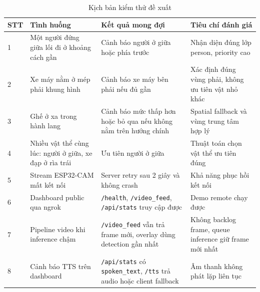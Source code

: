 \documentclass[oneside,final]{hcmut-report}
\begin{document}
\begin{table}[H]
  \centering
  \caption{Kịch bản kiểm thử đề xuất}
  \label{tab:test-scenarios}
  \small
  \begin{tabularx}{\textwidth}{L{1.0cm}Y Y Y}
    \toprule
    \textbf{STT} & \textbf{Tình huống} & \textbf{Kết quả mong đợi} & \textbf{Tiêu chí đánh giá} \\
     & Một người đứng giữa lối đi ở khoảng cách gần & Cảnh báo người ở giữa hoặc phía trước & Nhận diện đúng lớp person, priority cao \\
    2 & Xe máy nằm ở mép phải khung hình & Cảnh báo xe máy bên phải nếu đủ gần & Xác định đúng vùng phải, không ưu tiên vật nhỏ khác \\
    3 & Ghế ở xa trong hành lang & Cảnh báo mức thấp hơn hoặc bỏ qua nếu không nằm trên hướng chính & Spatial fallback và vùng trung tâm hợp lý \\
    4 & Nhiều vật thể cùng lúc: người ở giữa, xe đạp ở rìa trái & Ưu tiên người ở giữa & Thuật toán chọn vật thể ưu tiên đúng \\
    5 & Stream ESP32-CAM mất kết nối & Server retry sau 2 giây và không crash & Khả năng phục hồi kết nối \\
    6 & Dashboard public qua ngrok & \texttt{/health}, \texttt{/video\_feed}, \texttt{/api/stats} truy cập được & Demo remote chạy được \\
    7 & Pipeline video khi inference chậm & \texttt{/video\_feed} vẫn trả frame mới, overlay dùng detection gần nhất & Không backlog frame, queue inference giữ frame mới nhất \\
    8 & Cảnh báo TTS trên dashboard & \texttt{/api/stats} có \texttt{spoken\_text}, \texttt{/tts} trả audio hoặc client fallback & Âm thanh không phát lặp liên tục \\
    \bottomrule
  \end{tabularx}
\end{table}
\end{document}
